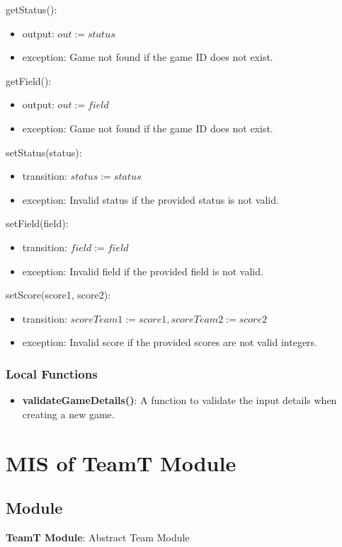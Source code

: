 \documentclass[12pt, titlepage]{article}
\begin{document}
\begin{itemize}
\noindent getStatus():
\begin{itemize}
  \item output: $out := status$
  \item exception: Game not found if the game ID does not exist.
\end{itemize}

\noindent getField():
\begin{itemize}
  \item output: $out := field$
  \item exception: Game not found if the game ID does not exist.
\end{itemize}

\noindent setStatus(status):
\begin{itemize}
  \item transition: $status := status$
  \item exception: Invalid status if the provided status is not valid.
\end{itemize}

\noindent setField(field):
\begin{itemize}
  \item transition: $field := field$
  \item exception: Invalid field if the provided field is not valid.
\end{itemize}

\noindent setScore(score1, score2):
\begin{itemize}
  \item transition: $scoreTeam1 := score1, scoreTeam2 := score2$
  \item exception: Invalid score if the provided scores are not valid integers.
\end{itemize}

\subsubsection{Local Functions}
\begin{itemize}
  \item \textbf{validateGameDetails()}: A function to validate the input details when creating a new game.
\end{itemize}

\section{MIS of TeamT Module} \label{TeamModule}

\subsection{Module}
\textbf{TeamT Module}: Abstract Team Module


\end{itemize}
\end{document}
